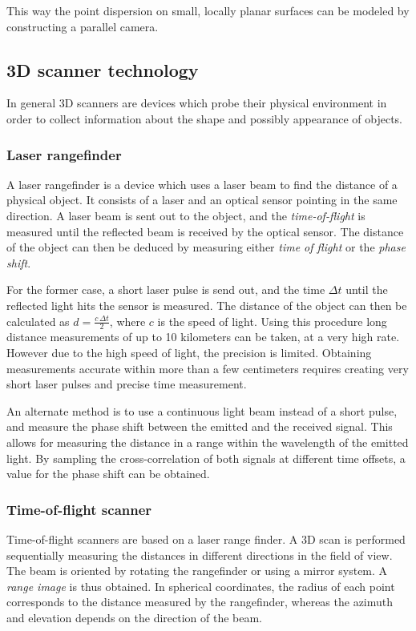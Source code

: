 This way the point dispersion on small, locally planar surfaces can be modeled by constructing a parallel camera.


\subsection{3D scanner technology}
In general 3D scanners are devices which probe their physical environment in order to collect information about the shape and possibly appearance of objects.

\subsubsection{Laser rangefinder}
A laser rangefinder is a device which uses a laser beam to find the distance of a physical object. It consists of a laser and an optical sensor pointing in the same direction. A laser beam is sent out to the object, and the \emph{time-of-flight} is measured until the reflected beam is received by the optical sensor. The distance of the object can then be deduced by measuring either \emph{time of flight} or the \emph{phase shift}.

For the former case, a short laser pulse is send out, and the time $\Delta t$ until the reflected light hits the sensor is measured. The distance of the object can then be calculated as $d = \frac{c \, \Delta t}{2}$, where $c$ is the speed of light. Using this procedure long distance measurements of up to 10 kilometers can be taken, at a very high rate. However due to the high speed of light, the precision is limited. Obtaining measurements accurate within more than a few centimeters requires creating very short laser pulses and precise time measurement.

An alternate method is to use a continuous light beam instead of a short pulse, and measure the phase shift between the emitted and the received signal. This allows for measuring the distance in a range within the wavelength of the emitted light. By sampling the cross-correlation of both signals at different time offsets, a value for the phase shift can be obtained.

\subsubsection{Time-of-flight scanner}
Time-of-flight scanners are based on a laser range finder. A 3D scan is performed sequentially measuring the distances in different directions in the field of view. The beam is oriented by rotating the rangefinder or using a mirror system. A \emph{range image} is thus obtained. In spherical coordinates, the radius of each point corresponds to the distance measured by the rangefinder, whereas the azimuth and elevation depends on the direction of the beam. 


